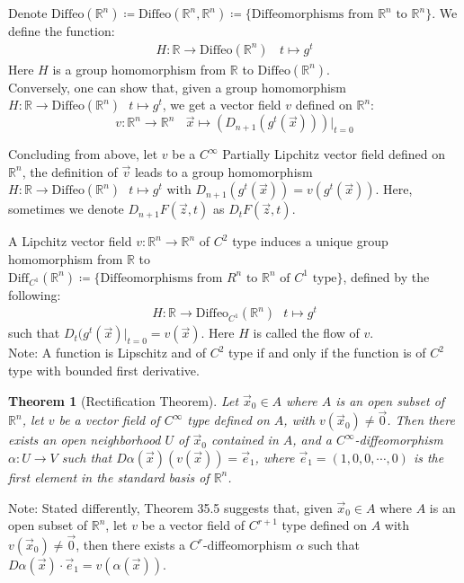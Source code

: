 \documentclass[11pt,oneside]{book}
\theoremstyle{break}
\theoremstyle{break}
\newtheorem{thm}{Theorem}[section]
\newcommand{\R}{\mathbb{R}}
\newcommand{\note}{\color{red}Note: \color{black}}
\begin{document}
Denote $\text{Diffeo}(\R^n)\coloneqq \text{Diffeo}(\R^n, \R^n) \coloneqq \{\text{Diffeomorphisms from }\R^n \text{ to }\R^n\}$. We define the function:
\begin{align*}
H:\R \to \text{Diffeo}(\R^n) \ \ \ \ t\mapsto g^t
\end{align*}
Here $H$ is a group homomorphism from $\R$ to $\text{Diffeo}(\R^n)$.\\

Conversely, one can show that, given a group homomorphism $H: \R \to \text{Diffeo}(\R^n) \ \ \ t\mapsto g^t$, we get a vector field $v$ defined on $\R^n$:
$$v:\R^n \to \R^n \ \ \ \ \vec{x}\mapsto\left( D_{n+1}(g^t(\vec{x}))\right)|_{t = 0}$$

Concluding from above, let $v$ be a $C^\infty$ Partially Lipchitz vector field defined on $\R^n$, the definition of $\vec{v}$ leads to a group homomorphism $H: \R \to \text{Diffeo}(\R^n) \ \ \ t\mapsto g^t$ with $D_{n+1}(g^t(\vec{x})) = v(g^t(\vec{x}))$. Here, sometimes we denote $D_{n+1}F(\vec{z},t)$ as $D_{t}F(\vec{z},t)$. 
\newpage

A Lipchitz vector field $v:\R^n \to \R^n$ of $C^2$ type induces a unique group homomorphism from $\R$ to $\text{Diff}_{C^1}(\R^n) \coloneqq \{\text{Diffeomorphisms from }R^n \text{ to }\R^n \text{ of }C^1 \text{ type}\}$, defined by the following:
\begin{align*}
H : \R \to \text{Diffeo}_{C^1}(\R^n) \ \ \ t\mapsto g^t
\end{align*}
such that $D_{t}(g^t(\vec{x})|_{t=0} = v(\vec{x})$. Here $H$ is called the flow of $v$.\\

\note A function is Lipschitz and of $C^2$ type if and only if the function is of $C^2$ type with bounded first derivative.


\begin{thm}[Rectification Theorem]
Let $\vec{x}_0 \in A$ where $A $ is an open subset of $\R^n$, let $v $ be a vector field of $C^\infty$ type defined on $A$, with $v(\vec{x}_0) \neq \vec{0}$. Then there exists an open neighborhood $U$ of $\vec{x}_0$ contained in $A$, and a $C^\infty$-diffeomorphism $\alpha:U\to V$ such that $D\alpha(\vec{x})(v(\vec{x})) = \vec{e}_1$, where $\vec{e}_1 = (1,0,0,\cdots, 0)$ is the first element in the standard basis of $\R^n$. 
\end{thm}

\note Stated differently, Theorem 35.5 suggests that, given $\vec{x}_0 \in A$ where $A$ is an open subset of $\R^n$, let $v $ be a vector field of $C^{r+1}$ type defined on $A$ with $v(\vec{x}_0) \neq \vec{0}$, then there exists a $C^r$-diffeomorphism $\alpha$ such that $D\alpha(\vec{x})\cdot \vec{e}_1 = v(\alpha(\vec{x}))$. 
\end{document}
